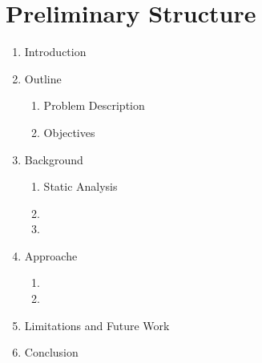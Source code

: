\chapter{Preliminary Structure}
\label{ch:preliminarystructure}

\renewcommand\theenumii{\theenumi.\arabic{enumii}}
\renewcommand\labelenumii{\theenumii}

	\begin{enumerate}
		\item Introduction
		\item Outline
		\begin{enumerate}
			\item Problem Description
			\item Objectives
		\end{enumerate}
		\item Background
		\begin{enumerate}
			\item Static Analysis
			\item 
			\item
		\end{enumerate}
		\item Approache
		\begin{enumerate}
			\item 
			\item 
		\end{enumerate}
		\item Limitations and Future Work
		\item Conclusion
	\end{enumerate}
	
